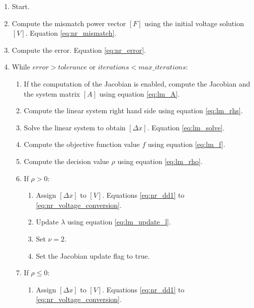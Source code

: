 \documentclass[nols,a4paper,twoside,symmetric,notoc,fleqn]{tufte-book}
\begin{document}
\begin{enumerate}

\item Start.

\item Compute the mismatch power vector $[F]$ using the initial voltage solution $[V]$. Equation \ref{eq:nr_mismatch}.

\item Compute the error. Equation \ref{eq:nr_error}.

\item While $error > tolerance$ or $iterations < max\_iterations$:

	\begin{enumerate}
	\item If the computation of the Jacobian is enabled, compute the Jacobian and the system matrix $[A]$ using equation \ref{eq:lm_A}.
	
	\item Compute the linear system right hand side using equation \ref{eq:lm_rhs}.
	
	\item Solve the linear system to obtain $[\Delta x]$. Equation \ref{eq:lm_solve}.
	
	\item Compute the objective function value $f$ using equation \ref{eq:lm_f}.
	
	\item Compute the decision value $\rho$ using equation \ref{eq:lm_rho}.
	
	\item If $\rho > 0$:
	
		\begin{enumerate}
		\item Assign $[\Delta x]$ to $[V]$. Equations \ref{eq:nr_dd1} to \ref{eq:nr_voltage_conversion}.
		
		\item Update $\lambda$ using equation \ref{eq:lm_update_l}.
		
		\item Set $\nu = 2$.
		
		\item Set the Jacobian update flag to true.
		\end{enumerate}
		
	\item If $\rho \leq 0$:
	
		\begin{enumerate}
		\item Assign $[\Delta x]$ to $[V]$. Equations \ref{eq:nr_dd1} to \ref{eq:nr_voltage_conversion}.
		

\end{enumerate}
\end{enumerate}
\end{enumerate}
\end{document}
